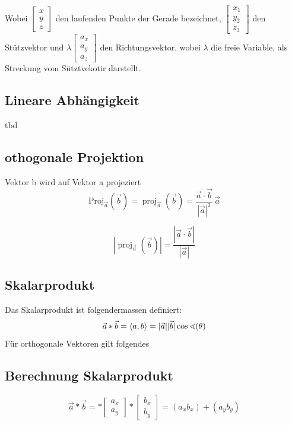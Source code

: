 \documentclass[9pt,a4paper]{article}
\begin{document}
    Wobei  $\begin{bmatrix} x \\ y \\ z \end{bmatrix}$ den laufenden Punkte der Gerade bezeichnet, $\begin{bmatrix} x _1 \\ y_2 \\ z_3 \end{bmatrix}$ den Stützvektor und $\lambda\begin{bmatrix} a_x \\ a_y \\ a_z \end{bmatrix}$ den Richtungsvektor, wobei $\lambda$ die freie Variable, als Streckung vom Sütztvekotir darstellt.
    \subsection{Lineare Abhängigkeit}
    tbd
    
    \subsection{othogonale Projektion}
    Vektor b wird auf Vektor a projeziert
    \[
    \text{Proj}_{\vec{a}}(\vec{b}) 
    = \operatorname{proj}_{\vec{a}}(\vec{b})
    = \frac{\vec{a}\cdot\vec{b}}{|\vec{a}|^2}\,\vec{a}
    \]
    
    \[
    \left|\operatorname{proj}_{\vec{a}}(\vec{b})\right|
    = \frac{|\vec{a}\cdot\vec{b}|}{|\vec{a}|}
    \]
    
    
    \subsection{Skalarprodukt}
    Das Skalarprodukt ist folgendermassen definiert:
    $$\vec{a}*\vec{b}=\braket{a,b}=|\vec{a}||\vec{b}|\cos\sphericalangle(\theta)$$
    Für orthogonale Vektoren gilt folgendes
    
    \subsection{Berechnung Skalarprodukt}
    $$\overrightarrow{a} * \overrightarrow{b} = *\begin{bmatrix}a_x\\a_y\end{bmatrix} *\begin{bmatrix}b_x\\b_y\end{bmatrix} =
    (a_x b_x) + (a_yb_y)$$
\end{document}
